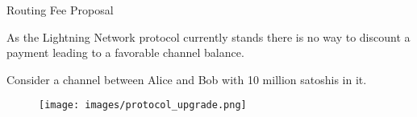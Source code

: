 
\vspace{3cm}
\LARGE{ Routing Fee Proposal } \\
\vspace{2mm}

As the Lightning Network protocol currently stands there is no way to discount a payment leading to a favorable channel balance.

Consider a channel between Alice and Bob with 10 million satoshis in it.  

\begin{figure}[!htb]
	\hspace*{-0.7cm} 
	\centering
	\texttt{[image: images/protocol\_upgrade.png]}

	\label{fig:xt_nodes}
	\hspace*{2mm} 	
\end{figure}

